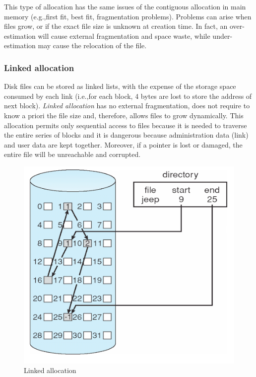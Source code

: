 This type of allocation has the same issues of the contiguous allocation in main memory (e.g.,\@ first fit, best fit, fragmentation problems). Problems can arise when files grow, or if the exact file size is unknown at creation time. In fact, an over-estimation will cause external fragmentation and space waste, while under-estimation may cause the relocation of the file.

\subsubsection{Linked allocation}
Disk files can be stored as linked lists, with the expense of the storage space consumed by each link (i.e.,\@ for each block, 4 bytes are lost to store the address of next block). \emph{Linked allocation} has no external fragmentation, does not require to know a priori the file size and, therefore, allows files to grow dynamically. This allocation permits only sequential access to files because it is needed to traverse the entire series of blocks and it is dangerous because administration data (link) and user data are kept together. Moreover, if a pointer is lost or damaged, the entire file will be unreachable and corrupted.

\begin{figure}[hbtp]
\centering
\includegraphics[scale=0.35]{images/file_system/linked_allocation.png}
\caption{Linked allocation}
\end{figure}

